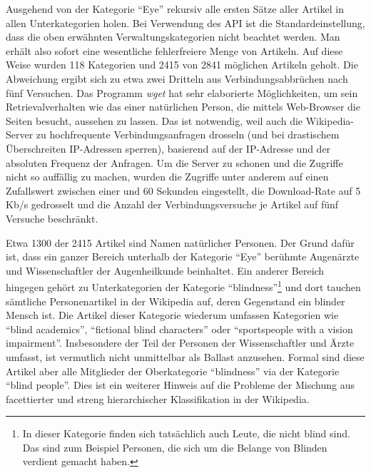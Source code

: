 \documentclass[pagesize,DIV=calc,12pt,final]{scrreprt}
\begin{document}
\begin{inparaenum}
\item Ausgehend von der Kategorie \enquote{Eye} rekursiv alle ersten Sätze aller Artikel in allen Unterkategorien holen. 
Bei Verwendung des API ist die Standardeinstellung, dass die oben erwähnten Verwaltungskategorien nicht beachtet werden. 
Man erhält also sofort eine wesentliche fehlerfreiere Menge von Artikeln. 
Auf diese Weise wurden 118 Kategorien und 2415 von 2841 möglichen Artikeln geholt. 
Die Abweichung ergibt sich zu etwa zwei Dritteln aus Verbindungsabbrüchen nach fünf Versuchen. 
Das Programm \emph{wget} hat sehr elaborierte Möglichkeiten, um sein Retrievalverhalten wie das einer natürlichen Person, die mittels Web-Browser die Seiten besucht, aussehen zu lassen. 
Das ist notwendig, weil auch die Wikipedia-Server zu hochfrequente Verbindungsanfragen drosseln (und bei drastischem Überschreiten IP-Adressen sperren), basierend auf der IP-Adresse und der absoluten Frequenz der Anfragen. 
Um die Server zu schonen und die Zugriffe nicht so auffällig zu machen, wurden die Zugriffe unter anderem auf einen Zufallswert zwischen einer und 60 Sekunden eingestellt, die Download-Rate auf 5 Kb/s gedrosselt und die Anzahl der Verbindungsversuche je Artikel auf fünf Versuche beschränkt. 

Etwa 1300 der 2415 Artikel sind Namen natürlicher Personen. 
Der Grund dafür ist, dass ein ganzer Bereich unterhalb der Kategorie \enquote{Eye} berühmte Augenärzte und Wissenschaftler der Augenheilkunde beinhaltet.
Ein anderer Bereich hingegen gehört zu Unterkategorien der Kategorie \enquote{blindness}\footnote{In dieser Kategorie finden sich tatsächlich auch Leute, die nicht blind sind. Das sind zum Beispiel Personen, die sich um die Belange von Blinden verdient gemacht haben.} und dort tauchen sämtliche Personenartikel in der Wikipedia auf, deren Gegenstand ein blinder Mensch ist.
Die Artikel dieser Kategorie wiederum umfassen Kategorien wie \enquote{blind academics}, \enquote{fictional blind characters} oder \enquote{sportspeople with a vision impairment}. 
Insbesondere der Teil der Personen der Wissenschaftler und Ärzte umfasst, ist vermutlich nicht unmittelbar als Ballast anzusehen. 
Formal sind diese Artikel aber alle Mitglieder der Oberkategorie \enquote{blindness} via der Kategorie \enquote{blind people}. 
Dies ist ein weiterer Hinweis auf die Probleme der Mischung aus facettierter und streng hierarchischer Klassifikation in der Wikipedia.


\end{inparaenum}
\end{document}
